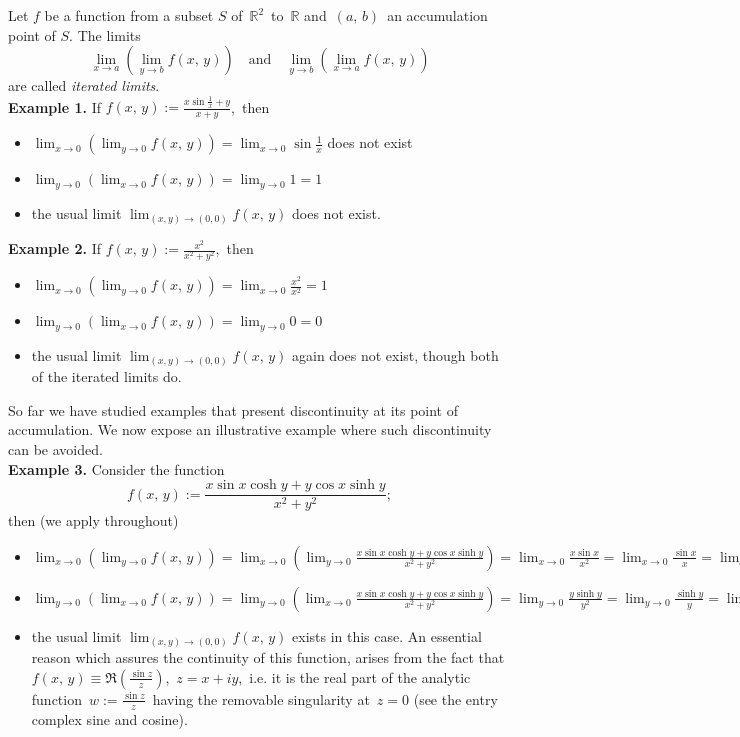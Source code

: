 \documentclass[12pt]{article}
\theoremstyle{definition}
\begin{document}
Let $f$ be a function from a subset $S$ of\, $\mathbb{R}^2$\, to\, $\mathbb{R}$ and\, $(a,\, b)$\, an accumulation point of $S$.  The limits
$$\lim_{x\to a}\left(\lim_{y\to b}f(x,\,y)\right) \quad\mbox{and}\quad \lim_{y\to b}\left(\lim_{x\to a}f(x,\,y)\right)$$
are called {\em iterated limits}.\\

\textbf{Example 1.}  If\; $\displaystyle f(x,\,y) := \frac{x\sin\frac{1}{x}+y}{x+y}$,\, then 
\begin{itemize}
\item $\lim_{x\to 0}\left(\lim_{y\to 0}f(x,\,y)\right) = \lim_{x\to0}\sin\frac{1}{x}$ does not exist
\item $\lim_{y\to 0}\left(\lim_{x\to 0}f(x,\,y)\right) = \lim_{y\to0}1 = 1$
\item the usual limit $\lim_{(x,y)\to(0,0)}f(x,\,y)$ does not exist.
\end{itemize}

\textbf{Example 2.}  If\; $\displaystyle f(x,\,y) := \frac{x^2}{x^2+y^2}$,\, then 
\begin{itemize}
\item $\lim_{x\to 0}\left(\lim_{y\to 0}f(x,\,y)\right) = \lim_{x\to0} \frac{x^2}{x^2} = 1$
\item $\lim_{y\to 0}\left(\lim_{x\to 0}f(x,\,y)\right) = \lim_{y\to0} 0 = 0$
\item the usual limit $\lim_{(x,y)\to(0,0)}f(x,\,y)$ again does not exist,  though both of the iterated limits do.
\end{itemize}

So far we have studied examples that present discontinuity at its point of accumulation. We now expose an illustrative example where such discontinuity can be avoided. \\

\textbf{Example 3.}  Consider the function
$$f(x,\,y) := \frac{x\sin{x}\cosh{y}+y\cos{x}\sinh{y}}{x^2+y^2};$$
then (we apply  throughout)
\begin{itemize}
\item 
$\lim_{x\to 0}\left(\lim_{y\to 0}f(x,\,y)\right) =
\lim_{x\to 0}\left(\lim_{y\to 0}\frac{x\sin x\cosh y+y\cos x\sinh y}{x^2+y^2}\right)= 
\lim_{x\to 0}\frac{x\sin x}{x^2}=\lim_{x\to 0}\frac{\sin x}{x}=\lim_{x\to 0}\cos x=1$
\item 
$\lim_{y\to 0}\left(\lim_{x\to 0}f(x,\,y)\right) =
\lim_{y\to 0}\left(\lim_{x\to 0}\frac{x\sin x\cosh y+y\cos x\sinh y}{x^2+y^2}\right)= 
\lim_{y\to 0}\frac{y\sinh y}{y^2}=\lim_{y\to 0}\frac{\sinh y}{y}=\lim_{y\to 0}\cosh y=1$
\item  the usual limit $\lim_{(x,y)\to(0,0)}f(x,\,y)$ exists in this case.  An essential reason which assures the continuity of this function, arises from the fact that\, $f(x,\,y) \equiv \Re(\frac{\sin z}{z})$,\, $z = x+iy$,\, i.e. it is the real part of the analytic function \,$w := \frac{\sin z}{z}$\, having the removable singularity at\, $z = 0$ (see the entry complex sine and cosine). 
\end{itemize}


\end{document}

